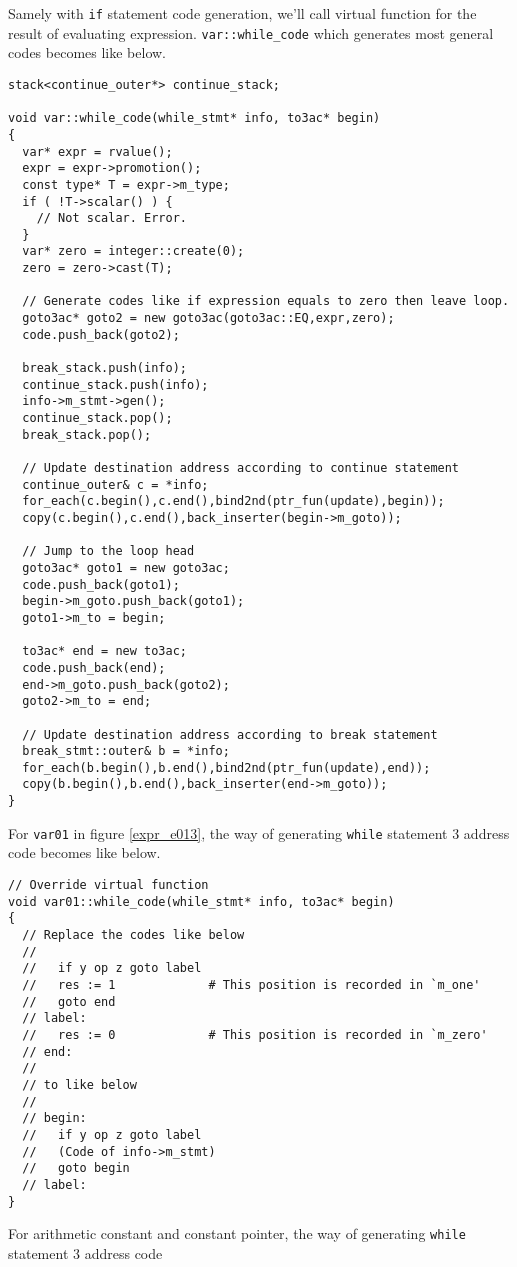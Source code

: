 Samely with {\tt{if}} statement code generation,
we'll call virtual function for the result of evaluating
expression. 
{\tt{var::while\_code}} which generates most general codes
becomes like below.
\begin{verbatim}
stack<continue_outer*> continue_stack;

void var::while_code(while_stmt* info, to3ac* begin)
{
  var* expr = rvalue();
  expr = expr->promotion();
  const type* T = expr->m_type;
  if ( !T->scalar() ) {
    // Not scalar. Error.
  }
  var* zero = integer::create(0);
  zero = zero->cast(T);

  // Generate codes like if expression equals to zero then leave loop.
  goto3ac* goto2 = new goto3ac(goto3ac::EQ,expr,zero);
  code.push_back(goto2);

  break_stack.push(info);
  continue_stack.push(info);
  info->m_stmt->gen();
  continue_stack.pop();
  break_stack.pop();

  // Update destination address according to continue statement
  continue_outer& c = *info;
  for_each(c.begin(),c.end(),bind2nd(ptr_fun(update),begin));
  copy(c.begin(),c.end(),back_inserter(begin->m_goto));

  // Jump to the loop head
  goto3ac* goto1 = new goto3ac;
  code.push_back(goto1);
  begin->m_goto.push_back(goto1);
  goto1->m_to = begin;

  to3ac* end = new to3ac;
  code.push_back(end);
  end->m_goto.push_back(goto2);
  goto2->m_to = end;

  // Update destination address according to break statement
  break_stmt::outer& b = *info;
  for_each(b.begin(),b.end(),bind2nd(ptr_fun(update),end));
  copy(b.begin(),b.end(),back_inserter(end->m_goto));
}
\end{verbatim}
For {\tt{var01}} in figure \ref{expr_e013},
the way of generating {\tt{while}} statement 3 address code
becomes like below.
\begin{verbatim}
// Override virtual function
void var01::while_code(while_stmt* info, to3ac* begin)
{
  // Replace the codes like below
  //
  //   if y op z goto label
  //   res := 1             # This position is recorded in `m_one'
  //   goto end
  // label:
  //   res := 0             # This position is recorded in `m_zero'
  // end:
  //
  // to like below
  //
  // begin:
  //   if y op z goto label
  //   (Code of info->m_stmt)
  //   goto begin
  // label:
}
\end{verbatim}
For arithmetic constant and constant pointer,
the way of generating {\tt{while}} statement 3 address code
